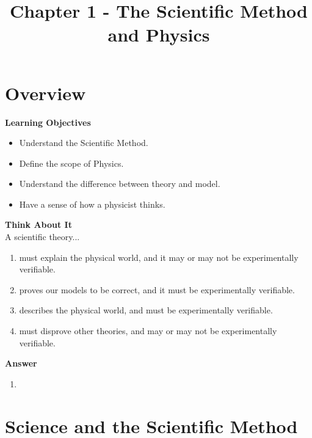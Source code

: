 \documentclass[9pt,Preprint]{lapreprint}
\title{Chapter 1 - The Scientific Method and Physics}
\begin{document}
\maketitle


\section{Overview}\label{chap:introduction}

\begin{framed}
\textbf{Learning Objectives}\\
\begin{itemize}
\item Understand the Scientific Method.
\item Define the scope of Physics.
\item Understand the difference between theory and model.
\item Have a sense of how a physicist thinks.
\end{itemize}
\end{framed}

\begin{framed}
\textbf{Think About It}\\
A scientific theory...

\begin{enumerate}
\item must explain the physical world, and it may or may not be experimentally verifiable.
\item proves our models to be correct, and it must be experimentally verifiable.
\item describes the physical world, and must be experimentally verifiable.
\item must disprove other theories, and may or may not be experimentally verifiable.
\end{enumerate}

\begin{framed}
\textbf{Answer}\\
\begin{enumerate}[resume]
\item
\end{enumerate}
\end{framed}
\end{framed}

\section{Science and the Scientific Method}
\end{document}
